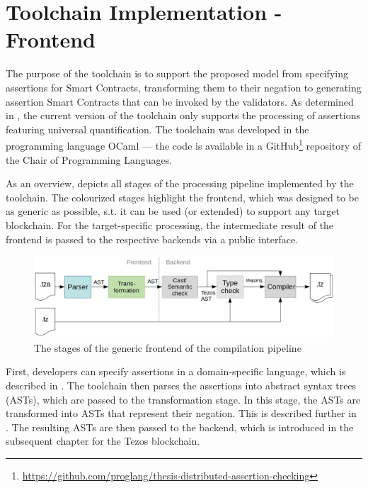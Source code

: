 

\chapter{Toolchain Implementation - Frontend}\label{chap:offline}
The purpose of the toolchain is to support the proposed model from specifying assertions for Smart Contracts, transforming them to their negation to generating assertion Smart Contracts that can be invoked by the validators. As determined in , the current version of the toolchain only supports the processing of assertions featuring universal quantification. The toolchain was developed in the programming language OCaml \cite{ocaml_docs} --- the code is available in a GitHub\footnote{\url{https://github.com/proglang/thesis-distributed-assertion-checking}} repository of the Chair of Programming Languages.

As an overview,  depicts all stages of the processing pipeline implemented by the toolchain. The colourized stages highlight the frontend, which was designed to be as generic as possible, s.t. it can be used (or extended) to support any target blockchain. For the target-specific processing, the intermediate result of the frontend is passed to the respective backends via a public interface.

\begin{figure}[h]
\includegraphics[width=\linewidth]{figures/3-offline/pipeline_frontend}
\caption{The stages of the generic frontend of the compilation pipeline}
\label{fig:pipeline_frontend}
\end{figure}

First, developers can specify assertions in a domain-specific language, which is described in . The toolchain then parses the assertions into abstract syntax trees (ASTs), which are passed to the transformation stage. In this stage, the ASTs are transformed into ASTs that represent their negation. This is described further in . The resulting ASTs are then passed to the backend, which is introduced in the subsequent chapter for the Tezos blockchain.

